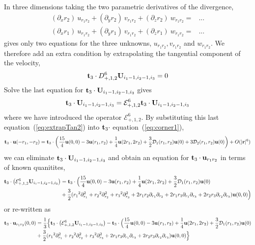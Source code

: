\documentclass[10pt]{article}
\begin{document}
In three dimensions taking the two parametric derivatives of the divergence, 
\begin{align}
    (\partial_x r_2) ~ u_{r_1 r_2} + (\partial_y r_2) ~v_{r_1 r_2} + (\partial_z r_2) ~w_{r_1 r_2} =& 
                     ...  \label{eq:div3a}\\
    (\partial_x r_1) ~u_{r_1 r_2}  + (\partial_y r_1) ~v_{r_1 r_2} + (\partial_z r_1) ~w_{r_1 r_2} =&
                     ...  \label{eq:div3b}
\end{align}
gives only two equations for the three unknowns, $u_{r_1 r_2},v_{r_1 r_2}$ and $w_{r_1 r_2}$.
We therefore add an extra condition by extrapolating the tangential component of the velocity,
\begin{equation}
\mathbf{ t}_3 \cdot D_{+,1,2}^6  \mathbf{U}_{i_1-1,i_2-1,i_3} = 0  \label{eq:extrapTan}
\end{equation}
Solve the last equation for $\mathbf{ t}_3\cdot \mathbf{U}_{i_1-1,i_2-1,i_3}$ gives
\begin{equation}
\mathbf{ t}_3\cdot \mathbf{U}_{i_1-1,i_2-1,i_3} = {\mathcal E}_{+,1,2}^6 \mathbf{ t}_3\cdot\mathbf{U}_{i_1-1,i_2-1,i_3}  \label{eq:extrapTan2}
\end{equation}
where we have introduced the operator ${\mathcal E}_{+,1,2}^6$.
By substituting this last equation~(\ref{eq:extrapTan2}) into $\mathbf{ t}_3\cdot$ equation~(\ref{eq:corner1}),
\[
 \mathbf{ t}_3\cdot \mathbf{ u}(-{r_1},-{r_2}) =\mathbf{ t}_3\cdot\left( {15\over4} \mathbf{ u}(0,0) - 3 \mathbf{ u}({r_1},{r_2}) + {1\over 4}\mathbf{ u}(2{r_1},2{r_2}) 
                 + {3\over2}{\mathcal D}_1({r_1},{r_2})\mathbf{ u}(0)
                 + 3{\mathcal D}_2({r_1},{r_2})\mathbf{ u}(0) \right) +  O(|\mathbf{ r}|^6) 
\]
we can eliminate $\mathbf{ t}_3 \cdot\mathbf{U}_{i_1-1,i_2-1,i_3}$ and obtain an equation for 
$\mathbf{ t}_3 \cdot \mathbf{ u}_{r_1 r_2}$ in terms of known quanitites,
\begin{align*}
\mathbf{ t}_3 \cdot \left( {\mathcal E}_{+,1,2}^6 \mathbf{U}_{i_1-1,i_2-1,i_3} \right) 
  &= \mathbf{ t}_3\cdot\Big( {15\over4} \mathbf{ u}(0,0) - 3 \mathbf{ u}({r_1},{r_2}) + {1\over 4}\mathbf{ u}(2{r_1},2{r_2}) + {3\over2}{\mathcal D}_1({r_1},{r_2})\mathbf{ u}(0) \\
  & + {3\over2}( {r_1}^2\partial_{r_1}^2+{r_2}^2\partial_{r_2}^2 +{r_3}^2\partial_{r_3}^2
  + 2{r_1}{r_2}\partial_{r_1}\partial_{r_2} + 2{r_1}{r_3}\partial_{r_1}\partial_{r_3} + 2{r_2}{r_3}\partial_{r_2}\partial_{r_3}  )\mathbf{ u}(0,0)
                \Big)
\end{align*}
or re-written as
\begin{align}
  \mathbf{ t}_3\cdot \mathbf{ u}_{r_1 r_2}(0,0) &= {1\over 3}\Big\{
               \mathbf{ t}_3 \cdot \left( {\mathcal E}_{+,1,2}^6 \mathbf{U}_{i_1-1,i_2-1,i_3} \right) 
        -  \mathbf{ t}_3\cdot\Big( {15\over4} \mathbf{ u}(0,0) - 3 \mathbf{ u}({r_1},{r_2}) + {1\over 4}\mathbf{ u}(2{r_1},2{r_2})
             + {3\over2}{\mathcal D}_1({r_1},{r_2})\mathbf{ u}(0)  \label{eq:div3c} \\
  & + {3\over2}( {r_1}^2\partial_{r_1}^2+{r_2}^2\partial_{r_2}^2 +{r_3}^2\partial_{r_3}^2
  + 2{r_1}{r_3}\partial_{r_1}\partial_{r_3} + 2{r_2}{r_3}\partial_{r_2}\partial_{r_3}
    )\mathbf{ u}(0,0)     \Big\}\nonumber
\end{align}
\end{document}
